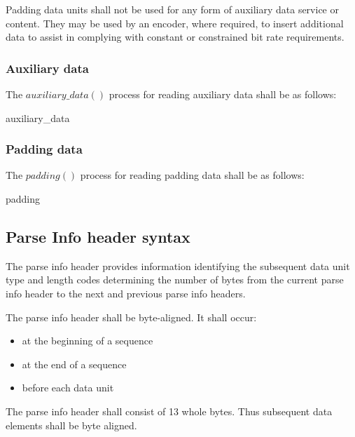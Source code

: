Padding data units shall not be used for any form of auxiliary data 
service or content. They may be used by an encoder, where required, 
to insert additional data to assist in complying with constant or constrained bit rate requirements.

\subsubsection{Auxiliary data}\label{auxdata}

The $auxiliary\_data()$ process for reading auxiliary data shall be as follows:

\begin{pseudo}{auxiliary\_data}{}
\bsEND
\end{pseudo}

\subsubsection{Padding data}\label{paddingdata}

The $padding()$ process for reading padding data shall be as follows:

\begin{pseudo}{padding}{}
\bsEND
\end{pseudo}

\subsection{Parse Info header syntax}
\label{parseinfoheader}

The parse info header provides information identifying the subsequent data unit
type and length codes determining the number of bytes from the current parse
info header to the next and previous parse info headers.

The parse info header shall be byte-aligned. It shall occur:
\begin{itemize}
\item at the beginning of a sequence
\item at the end of a sequence
\item before each data unit
\end{itemize}

The parse info header shall consist of 13 whole bytes. Thus subsequent data elements
shall be byte aligned.

